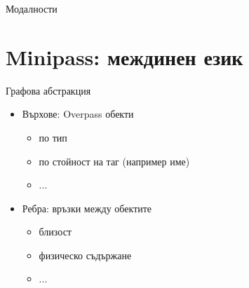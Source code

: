 \documentclass[9pt]{beamer}
\begin{document}
  \begin{frame}{Модалности}
    \begin{center}
    \end{center}
  \end{frame}

  \section{Minipass: междинен език}
  \begin{frame}{Графова абстракция}
    \begin{itemize}
      \item Върхове: Overpass обекти
        \begin{itemize}
          \item по тип
          \item по стойност на таг (например име)
          \item ...
        \end{itemize}
      \item Ребра: връзки между обектите \pika
        \begin{itemize}
          \item близост
          \item физическо съдържане
          \item ...
        \end{itemize}
    \end{itemize}
  \end{frame}
\end{document}
